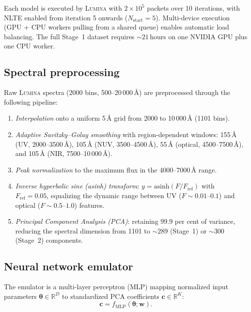 \documentclass[fleqn,usenatbib]{mnras}
\newcommand{\lumina}{\textsc{Lumina}}
\begin{document}
Each model is executed by \lumina{} with $2\times10^5$ packets over 10 iterations, with NLTE enabled from iteration 5 onwards ($N_\mathrm{start} = 5$). Multi-device execution (GPU + CPU workers pulling from a shared queue) enables automatic load balancing. The full Stage~1 dataset requires ${\sim}21$\,hours on one NVIDIA GPU plus one CPU worker.

\subsection{Spectral preprocessing}
\label{sec:preprocessing}

Raw \lumina{} spectra (2000 bins, 500--20\,000\,\AA) are preprocessed through the following pipeline:
\begin{enumerate}
    \item \textit{Interpolation} onto a uniform 5\,\AA{} grid from 2000 to 10\,000\,\AA{} (1101 bins).
    \item \textit{Adaptive Savitzky--Golay smoothing} with region-dependent windows: 155\,\AA{} (UV, 2000--3500\,\AA), 105\,\AA{} (NUV, 3500--4500\,\AA), 55\,\AA{} (optical, 4500--7500\,\AA), and 105\,\AA{} (NIR, 7500--10\,000\,\AA).
    \item \textit{Peak normalization} to the maximum flux in the 4000--7000\,\AA{} range.
    \item \textit{Inverse hyperbolic sine (asinh) transform}: $y = \mathrm{asinh}(F/F_\mathrm{ref})$ with $F_\mathrm{ref} = 0.05$, equalizing the dynamic range between UV ($F \sim 0.01$--$0.1$) and optical ($F \sim 0.5$--$1.0$) features.
    \item \textit{Principal Component Analysis (PCA)}: retaining 99.9 per cent of variance, reducing the spectral dimension from 1101 to ${\sim}289$ (Stage~1) or ${\sim}300$ (Stage~2) components.
\end{enumerate}

\subsection{Neural network emulator}
\label{sec:emulator}

The emulator is a multi-layer perceptron (MLP) mapping normalized input parameters $\boldsymbol{\theta} \in \mathbb{R}^D$ to standardized PCA coefficients $\mathbf{c} \in \mathbb{R}^K$:
\begin{equation}
\mathbf{c} = f_\mathrm{MLP}(\boldsymbol{\theta}; \mathbf{w}) .
\end{equation}
\end{document}
